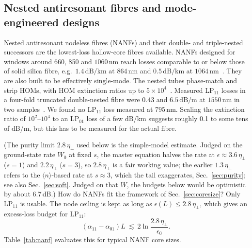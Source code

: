 \documentclass[11pt,a4paper]{article}
\newcommand{\SI}[2]{\ensuremath{#1\,\mathrm{#2}}}
\newcommand{\etaeff}{\eta_{\perp}}
\begin{document}
\subsection{Nested antiresonant fibres and mode-engineered designs}
\label{sec:nanf}
Nested antiresonant nodeless fibres (NANFs) and their double- and triple-nested successors are the lowest-loss hollow-core fibres available. NANFs designed for windows around 660, 850 and \SI{1060}{nm} reach losses comparable to or below those of solid silica fibre, e.g.\ \SI{1.4}{dB/km} at \SI{864}{nm} and \SI{0.5}{dB/km} at \SI{1064}{nm}~\cite{sakr2020}. They are also built to be effectively single-mode. The nested tubes phase-match and strip HOMs, with HOM extinction ratios up to $5\times10^4$~\cite{gao2024}. Measured LP$_{11}$ losses in a four-fold truncated double-nested fibre were 0.43 and \SI{6.5}{dB/m} at \SI{1550}{nm} in two samples~\cite{gao2024}. We found no LP$_{11}$ loss measured at \SI{795}{nm}. Scaling the extinction ratio of $10^2$--$10^4$ to an LP$_{01}$ loss of a few dB/km suggests roughly 0.1 to some tens of dB/m, but this has to be measured for the actual fibre.

(The purity limit $2.8\,\etaeff$ used below is the simple-model estimate. Judged on the ground-state rate $W_0$ at fixed $s$, the master equation halves the rate at $\epsilon\approx3.6\,\etaeff$ ($s=1$) and $2.2\,\etaeff$ ($s=3$), so $2.8\,\etaeff$ is a fair working value; the earlier $1.3\,\etaeff$ refers to the $\langle n\rangle$-based rate at $s\approx3$, which the tail exaggerates, Sec.~\ref{sec:purity}; see also Sec.~\ref{sec:soft}. Judged on that $W$, the budgets below would be optimistic by about 6.7\,dB.) How do NANFs fit the framework of Sec.~\ref{sec:coresize}? Only LP$_{11}$ is usable. The node ceiling is kept as long as $\epsilon(L)\le2.8\,\etaeff$, which gives an excess-loss budget for LP$_{11}$:
\begin{equation}
  (\alpha_{11}-\alpha_{01})L\ \lesssim\ 2\ln\frac{2.8\,\etaeff}{\epsilon_0}.
  \label{eq:nanfbudget}
\end{equation}
Table~\ref{tab:nanf} evaluates this for typical NANF core sizes.
\end{document}
